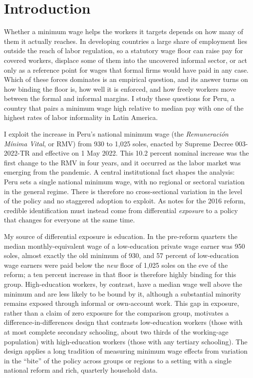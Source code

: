 \section{Introduction}\label{sec:intro}

Whether a minimum wage helps the workers it targets depends on how many of them it actually
reaches. In developing countries a large share of employment lies outside the reach of labor
regulation, so a statutory wage floor can raise pay for covered workers, displace some of
them into the uncovered informal sector, or act only as a reference point for wages that
formal firms would have paid in any case. Which of these forces dominates is an empirical
question, and its answer turns on how binding the floor is, how well it is enforced, and how
freely workers move between the formal and informal margins. I study these questions for
Peru, a country that pairs a minimum wage high relative to median pay with one of the highest
rates of labor informality in Latin America.

I exploit the increase in Peru's national minimum wage (the \emph{Remuneración Mínima
Vital}, or RMV) from 930 to 1,025 soles, enacted by Supreme Decree 003-2022-TR and effective
on 1 May 2022. This 10.2 percent nominal increase was the first change to the RMV in four
years, and it occurred as the labor market was emerging from the pandemic. A central
institutional fact shapes the analysis: Peru sets a single national minimum wage, with no
regional or sectoral variation in the general regime. There is therefore no cross-sectional
variation in the level of the policy and no staggered adoption to exploit. As
\citet{jimenez_2023} notes for the 2016 reform, credible identification must instead come
from differential \emph{exposure} to a policy that changes for everyone at the same time.

My source of differential exposure is education. In the pre-reform quarters the median
monthly-equivalent wage of a low-education private wage earner was 950 soles, almost exactly
the old minimum of 930, and 57 percent of low-education wage earners were paid below the
\emph{new} floor of 1,025 soles on the eve of the reform; a ten percent increase in that
floor is therefore highly binding for this group. High-education workers, by contrast, have
a median wage well above the minimum and are less likely to be bound by it, although a
substantial minority remains exposed through informal or own-account work. This gap in exposure, rather than a claim of zero
exposure for the comparison group, motivates a difference-in-differences design that
contrasts low-education workers (those with at most complete secondary schooling, about two
thirds of the working-age population) with high-education workers (those with any tertiary
schooling). The design applies a long tradition of measuring minimum wage effects from
variation in the ``bite'' of the policy across groups or regions \citep{card_1992, lee_1999,
machin_manning_rahman_2003} to a setting with a single national reform and rich, quarterly
household data.

